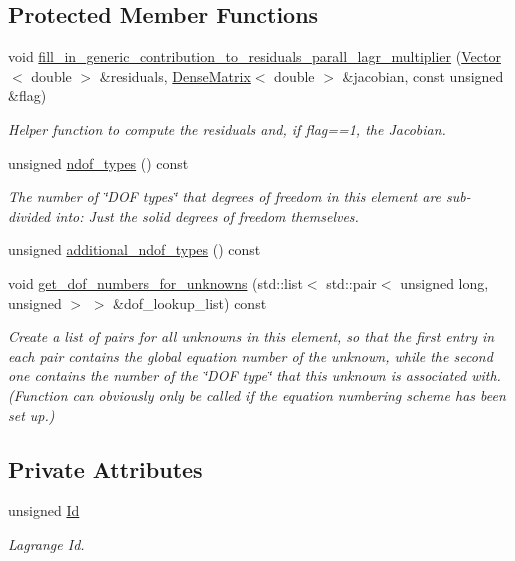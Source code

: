 \subsection*{Protected Member Functions}
\begin{DoxyCompactItemize}
\item 
void \hyperlink{classoomph_1_1ImposeImpenetrabilityElement_a943dc887f5a792524e418b23dea934c3}{fill\+\_\+in\+\_\+generic\+\_\+contribution\+\_\+to\+\_\+residuals\+\_\+parall\+\_\+lagr\+\_\+multiplier} (\hyperlink{classoomph_1_1Vector}{Vector}$<$ double $>$ \&residuals, \hyperlink{classoomph_1_1DenseMatrix}{Dense\+Matrix}$<$ double $>$ \&jacobian, const unsigned \&flag)
\begin{DoxyCompactList}\small\item\em Helper function to compute the residuals and, if flag==1, the Jacobian. \end{DoxyCompactList}\item 
unsigned \hyperlink{classoomph_1_1ImposeImpenetrabilityElement_a0aa0ca45ff2d80ca16708224d09749de}{ndof\+\_\+types} () const
\begin{DoxyCompactList}\small\item\em The number of \char`\"{}\+D\+O\+F types\char`\"{} that degrees of freedom in this element are sub-\/divided into\+: Just the solid degrees of freedom themselves. \end{DoxyCompactList}\item 
unsigned \hyperlink{classoomph_1_1ImposeImpenetrabilityElement_a9bd9f83e67108ac008efa20601fb1ade}{additional\+\_\+ndof\+\_\+types} () const
\item 
void \hyperlink{classoomph_1_1ImposeImpenetrabilityElement_a722461f623710d20a71a28b5fa6018a9}{get\+\_\+dof\+\_\+numbers\+\_\+for\+\_\+unknowns} (std\+::list$<$ std\+::pair$<$ unsigned long, unsigned $>$ $>$ \&dof\+\_\+lookup\+\_\+list) const
\begin{DoxyCompactList}\small\item\em Create a list of pairs for all unknowns in this element, so that the first entry in each pair contains the global equation number of the unknown, while the second one contains the number of the \char`\"{}\+D\+O\+F type\char`\"{} that this unknown is associated with. (Function can obviously only be called if the equation numbering scheme has been set up.) \end{DoxyCompactList}\end{DoxyCompactItemize}
\subsection*{Private Attributes}
\begin{DoxyCompactItemize}
\item 
unsigned \hyperlink{classoomph_1_1ImposeImpenetrabilityElement_a6a8cf1048dbcc32288ea8eca1e6c380d}{Id}
\begin{DoxyCompactList}\small\item\em Lagrange Id. \end{DoxyCompactList}\end{DoxyCompactItemize}
